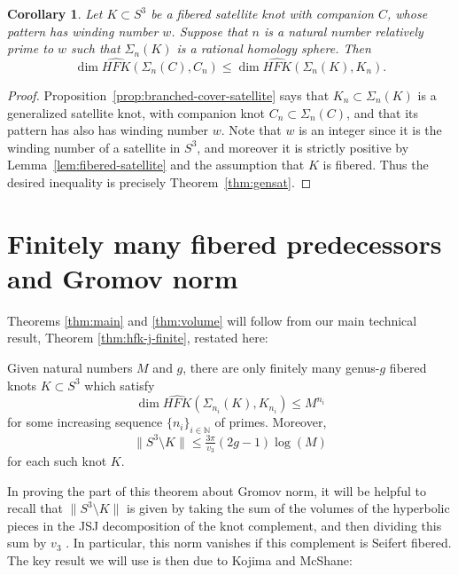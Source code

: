 \documentclass[11pt]{amsart}
\newtheorem {corollary}[theorem]{Corollary}
\numberwithin{equation}{section}
\numberwithin{theorem}{section}
\theoremstyle{definition}
\newenvironment{usetheoremcounterof}[1]{%
  \renewcommand\thetheorem{\ref{#1}}\theorem}{\endtheorem\addtocounter{theorem}{-1}}
\newcommand\HFK{\widehat{\mathit{HFK}}}
\begin{document}
\begin{corollary}
\label{cor:satcover}
Let $K\subset S^3$ be a fibered satellite knot with companion $C$, whose pattern has winding number $w$. Suppose that $n$ is a natural number relatively prime to $w$ such that $\Sigma_n(K)$ is a rational homology sphere. Then \[\dim\HFK(\Sigma_n(C),C_n)\leq \dim\HFK(\Sigma_n(K),K_n).\]
\end{corollary}

\begin{proof}
Proposition~\ref{prop:branched-cover-satellite} says that $K_n \subset \Sigma_n(K)$ is a generalized satellite knot, with companion knot $C_n \subset \Sigma_n(C)$, and that its pattern  has also has  winding number $w$.  Note that $w$ is an integer since it is the winding number of a satellite in $S^3$, and moreover it is strictly positive by Lemma~\ref{lem:fibered-satellite} and the assumption that $K$ is fibered.  Thus the desired inequality is precisely Theorem~\ref{thm:gensat}.
\end{proof}

%
%
%
%
%



\section{Finitely many fibered predecessors and Gromov norm} \label{sec:main-proof}

Theorems \ref{thm:main} and \ref{thm:volume} will follow from our main technical result, Theorem \ref{thm:hfk-j-finite}, restated here:

\begin{usetheoremcounterof} {thm:hfk-j-finite}
Given natural numbers $M$ and $g$, there are only finitely many genus-$g$ fibered knots $K\subset S^3$ which satisfy \[\dim\HFK(\Sigma_{n_i}(K),K_{n_i})\leq M^{n_i}\] for some increasing sequence $\{n_i\}_{i\in\mathbb{N}}$ of primes. Moreover, \begin{equation}\label{eq:gromov}\lVert S^3\setminus K \rVert \leq \tfrac{3\pi}{v_3}(2g-1)\log(M)\end{equation} for each such knot $K$.
\end{usetheoremcounterof}

In proving the part of this theorem about Gromov norm, it will be helpful to recall that $\lVert S^3\setminus K\rVert$ is given by taking the sum of the volumes of the hyperbolic pieces in the JSJ decomposition of the knot complement, and then dividing this sum by $v_3$ \cite{soma}. In particular, this norm vanishes if this complement is Seifert fibered. The key result we will use is then due to Kojima and McShane:
\end{document}
